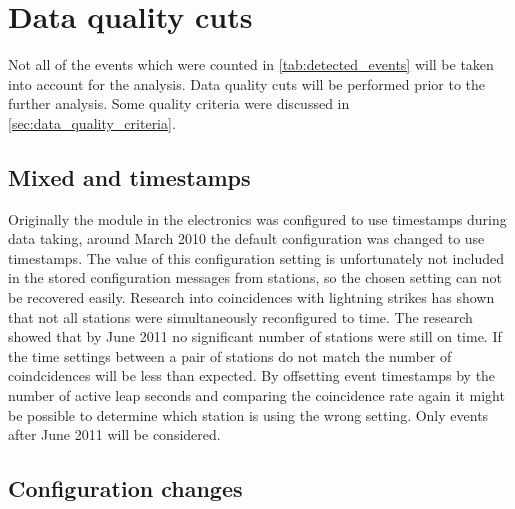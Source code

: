 \section{Data quality cuts}

Not all of the events which were counted in \cref{tab:detected_events} will be taken into account for the analysis. Data quality cuts will be performed prior to the further analysis. Some quality criteria were discussed in \cref{sec:data_quality_criteria}.


\subsection{Mixed \utc and \gps timestamps}

Originally the \gps module in the \hisparc electronics was configured to use \utc timestamps during data taking, around March 2010 the default configuration was changed to use \gps timestamps. The value of this configuration setting is unfortunately not included in the stored configuration messages from stations, so the chosen setting can not be recovered easily. Research into coincidences with lightning strikes has shown that not all \hisparc stations were simultaneously reconfigured to \gps time. The research showed that by June 2011 no significant number of stations were still on \utc time. If the time settings between a pair of stations do not match the number of coindcidences will be less than expected. By offsetting event timestamps by the number of active leap seconds and comparing the coincidence rate again it might be possible to determine which station is using the wrong setting. Only events after June 2011 will be considered.


\subsection{Configuration changes}

